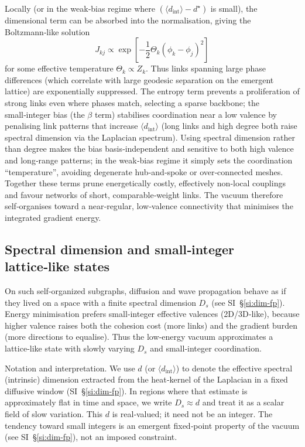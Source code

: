 \documentclass[11pt]{article}
\begin{document}
Locally (or in the weak‑bias regime where $(\langle d_{\text{int}} \rangle-d^\star)$ is small), the dimensional term can be absorbed into the normalisation, giving the Boltzmann‑like solution
\begin{equation}
J_{kj} \propto \exp\left[ - \frac{1}{2} \Theta_k (\phi_k - \phi_j)^2 \right]
\end{equation}
for some effective temperature $\Theta_k \propto Z_k$. Thus links spanning large phase differences (which correlate with large geodesic separation on the emergent lattice) are exponentially suppressed. The entropy term prevents a proliferation of strong links even where phases match, selecting a sparse backbone; the small‑integer bias (the $\beta$ term) stabilises coordination near a low valence by penalising link patterns that increase $\langle d_{\text{int}} \rangle$ (long links and high degree both raise spectral dimension via the Laplacian spectrum). Using spectral dimension rather than degree makes the bias basis‑independent and sensitive to both high valence and long‑range patterns; in the weak‑bias regime it simply sets the coordination ``temperature'', avoiding degenerate hub‑and‑spoke or over‑connected meshes. Together these terms prune energetically costly, effectively non‑local couplings and favour networks of short, comparable‑weight links. The vacuum therefore self‑organises toward a near‑regular, low‑valence connectivity that minimises the integrated gradient energy.

\subsection{Spectral dimension and small‑integer lattice‑like states}

On such self‑organized subgraphs, diffusion and wave propagation behave as if they lived on a space with a finite spectral dimension $D_s$ (see SI~\S\ref{si:dim-fp}). Energy minimisation prefers small‑integer effective valences (2D/3D‑like), because higher valence raises both the cohesion cost (more links) and the gradient burden (more directions to equalise). Thus the low‑energy vacuum approximates a lattice‑like state with slowly varying $D_s$ and small‑integer coordination.

Notation and interpretation. We use $d$ (or $\langle d_{\text{int}} \rangle$) to denote the effective spectral (intrinsic) dimension extracted from the heat‑kernel of the Laplacian in a fixed diffusive window (SI~\S\ref{si:dim-fp}). In regions where that estimate is approximately flat in time and space, we write $D_s \approx d$ and treat it as a scalar field of slow variation. This $d$ is real‑valued; it need not be an integer. The tendency toward small integers is an emergent fixed‑point property of the vacuum (see SI~\S\ref{si:dim-fp}), not an imposed constraint.
\end{document}
